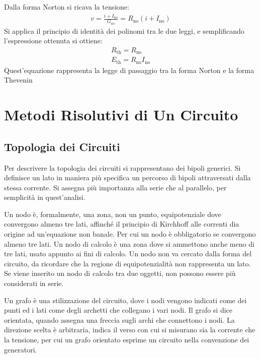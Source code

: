 \documentclass{article}
\numberwithin{equation}{subsection}
\begin{document}
Dalla forma Norton si ricava la tensione:
\begin{gather*}
    v=\displaystyle\frac{i+I_\mathrm{no}}{G_\mathrm{no}}=R_\mathrm{no}(i+I_\mathrm{no})
\end{gather*}
Si applica il principio di identità dei polinomi tra le due leggi, e semplificando l'espressione ottenuta si ottiene:
\begin{gather}
    R_\mathrm{th}=R_\mathrm{no}\\
    E_\mathrm{th}=R_\mathrm{no}I_\mathrm{no}
\end{gather}
Quest'equazione rappresenta la legge di passaggio tra la forma Norton e la forma Thevenin

\clearpage

\section{Metodi Risolutivi di Un Circuito}

\subsection{Topologia dei Circuiti}

Per descrivere la topologia dei circuiti si rappresentano dei bipoli generici. Si definisce un lato in maniera più specifica un percorso di bipoli attraversati dalla 
stessa corrente. Si assegna più importanza alla serie che al parallelo, per semplicità in quest'analisi. 

Un nodo è, formalmente, una zona, non un punto, equipotenziale dove convergono almeno tre lati, affinché il principio di Kirchhoff alle correnti dia origine ad un'equazione 
non banale. Per cui un nodo è obbligatorio se convergono almeno tre lati. Un nodo di calcolo è una zona dove si ammettono anche meno di tre lati, usato appunto ai fini di 
calcolo. Un nodo non va cercato dalla forma del circuito, da ricordare che la regione di equipotenzialità non rappresenta un lato. Se viene inserito un nodo di calcolo tra due 
oggetti, non possono essere più considerati in serie. 



Un grafo è una stilizzazione del circuito, dove i nodi vengono indicati come dei punti ed i lati come degli archetti che collegano i vari nodi. Il grafo si dice orientata, 
quando assegna una freccia sugli archi che connettono i nodi. La direzione scelta è arbitraria, indica il verso con cui si misurano sia la corrente che la tensione, per cui 
un grafo orientato esprime un circuito nella convenzione dei generatori.  
\end{document}

